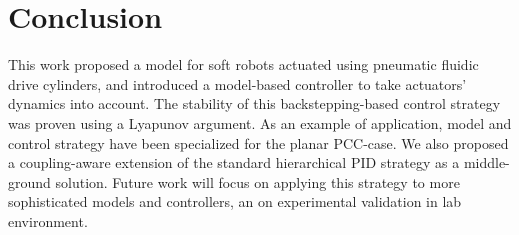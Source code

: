 \section{Conclusion}\label{sec:conclusion}
%
This work proposed a model for soft robots actuated using pneumatic fluidic drive cylinders, and introduced a model-based controller to take actuators' dynamics into account. The stability of this backstepping-based control strategy was proven using a Lyapunov argument.  As an example of application, model and control strategy have been specialized for the planar \gls{PCC}-case. We also proposed a coupling-aware extension of the standard hierarchical PID strategy as a middle-ground solution. %
%
Future work will focus on applying this strategy to more sophisticated models and controllers, an on experimental validation in lab environment. %